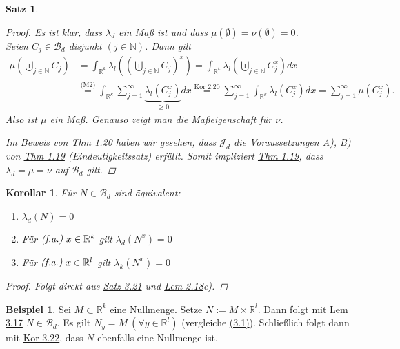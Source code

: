 \documentclass[a4paper]{scrreprt}
\newcommand{\R}{\mathbb{R}}
\newcommand{\N}{\mathbb{N}}
\newcommand{\Borel}{\mathcal{B}}
\newcommand{\Bd}{\Borel_d}
\newcommand{\Jd}{\mathcal{J}_d}
\newcommand{\bigdcup}{\biguplus}
\newcommand{\jlabel}[1]{\label{j_#1}}
\newcommand{\jshortlink}[1]{\jhyperref{#1}{\text{#1}}}
\newcommand{\jhyperref}[2]{\hyperref[j_#1]{#2}}
\newcommand{\jlink}[1]{\jhyperref{#1}{#1}}
\newcommand{\fa}{\text{\textit{(f.a.)}}}
\newcommand{\jspacesmall}{\vspace{4pt}}
\theoremstyle{plain}
\newtheorem{satz}[thm]{Satz}
\newtheorem{kor}[thm]{Korollar}
\theoremstyle{definition}
\newtheorem*{expl*}{Beispiel}
\begin{document}
{{{{\begin{satz}
\begin{proof}
        Es ist klar, dass $\lambda_d$ ein Maß ist und dass $\mu(\emptyset) = \nu(\emptyset) = 0$.\\
        Seien $C_j\in \Bd$ disjunkt $(j\in\N)$. Dann gilt
        \begin{displaymath}
            \begin{split}
                \mu\left( \bigdcup_{j\in\N} C_j \right) &= \int_{\R^k} \lambda_l \left (\left( \bigdcup_{j\in\N} C_j \right)^x \right) = \int_{\R^k} \lambda_l \left(\bigdcup_{j\in\N} C_j^x \right )dx\\
                &\overset{\text{(M2)}}{=} \int_{\R^k} \sum_{j=1}^\infty \underbrace{\lambda_l(C_j^x)}_{\ge 0}dx \overset{\jshortlink{Kor 2.20}}{=} \sum_{j=1}^\infty \int_{\R^k} \lambda_l(C_j^x)dx = \sum_{j=1}^\infty \mu(C_j^x).
            \end{split}
        \end{displaymath}
        Also ist $\mu$ ein Maß. Genauso zeigt man die Maßeigenschaft für $\nu$.
        
        \jspacesmall
        
        Im Beweis von \jlink{Thm 1.20} haben wir gesehen, dass $\Jd$ die Voraussetzungen A), B) von \jlink{Thm 1.19} (Eindeutigkeitssatz) erfüllt. Somit impliziert \jlink{Thm 1.19}, dass $\lambda_d = \mu = \nu$ auf $\Bd$ gilt.
        
    \end{proof}
\end{satz}

\begin{kor}
\jlabel{Kor 3.22}
    Für $N\in\Bd$ sind äquivalent:
    \begin{enumerate}
        \item $\lambda_d(N)=0$
        \item Für $\fa \ x\in\R^k$ gilt $\lambda_d(N^x) = 0$
        \item Für $\fa \ x\in\R^l$ gilt $\lambda_k(N^x) = 0$
    \end{enumerate}
    \begin{proof}
        Folgt direkt aus \jlink{Satz 3.21} und \jlink{Lem 2.18}c).
    \end{proof}
\end{kor}


\begin{expl*}
    Sei $M\subset \R^k$ eine Nullmenge. Setze $N:=M\times \R^l$. Dann folgt mit \jlink{Lem 3.17} $N\in \Bd$. Es gilt $N_y = M \ (\forall y\in \R^l)$ (vergleiche \jlink{(3.1)}). Schließlich folgt dann mit \jlink{Kor 3.22}, dass $N$ ebenfalls eine Nullmenge ist.
\end{expl*}


}}}}
\end{document}
